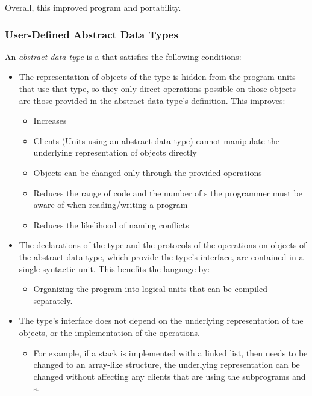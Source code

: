 Overall, this improved program  and portability.

\subsubsection{User-Defined Abstract Data Types}\label{subsubsec:User_Defined_Abstract_Data_Types}
\begin{definition}\label{def:Abstract_Data_Type}
  An \emph{abstract data type} is a  that satisfies the following conditions:
  \begin{itemize}[noitemsep]
  \item The representation of objects of the type is hidden from the program units that use that type, so they only direct operations possible on those objects are those provided in the abstract data type's definition. This improves:
    \begin{itemize}[noitemsep]
    \item Increases 
    \item Clients (Units using an abstract data type) cannot manipulate the underlying representation of objects directly
    \item Objects can be changed only through the provided operations
    \item Reduces the range of code and the number of s the programmer must be aware of when reading/writing a program
    \item Reduces the likelihood of naming conflicts
    \end{itemize}
  \item The declarations of the type and the protocols of the operations on objects of the abstract data type, which provide the type's interface, are contained in a single syntactic unit. This benefits the language by:
    \begin{itemize}[noitemsep]
    \item Organizing the program into logical units that can be compiled separately.
    \end{itemize}
  \item The type's interface does not depend on the underlying representation of the objects, or the implementation of the operations.
    \begin{itemize}[noitemsep]
    \item For example, if a stack is implemented with a linked list, then needs to be changed to an array-like structure, the underlying representation can be changed without affecting any clients that are using the subprograms and s.

\end{itemize}
\end{itemize}
\end{definition}
